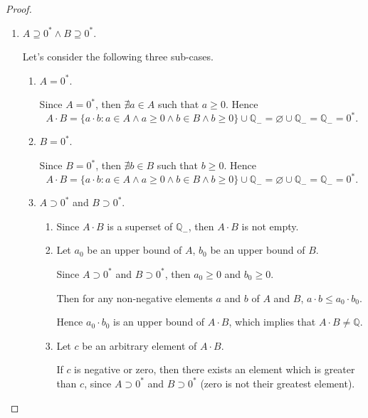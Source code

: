 \begin{proof}
    \begin{enumerate}[label={\textbf{Case \arabic*.}},itemindent={0.5cm}]
        \item $A\supseteq {0}^{*}\land B\supseteq {0}^{*}$.

              Let's consider the following three sub-cases.
              \begin{enumerate}
                  \item $A = {0}^{*}$.

                        Since $A = {0}^{*}$, then $\nexists a\in A$ such that $a\ge 0$. Hence
                        \[
                            A\cdot B = \{ a\cdot b: a\in A\land a\ge 0\land b\in B\land b\ge 0 \} \cup\mathbb{Q}_{-} = \varnothing\cup\mathbb{Q}_{-} = \mathbb{Q}_{-} = {0}^{*}.
                        \]
                  \item $B = {0}^{*}$.

                        Since $B = {0}^{*}$, then $\nexists b\in B$ such that $b\ge 0$. Hence
                        \[
                            A\cdot B = \{ a\cdot b: a\in A\land a\ge 0\land b\in B\land b\ge 0 \} \cup\mathbb{Q}_{-} = \varnothing\cup\mathbb{Q}_{-} = \mathbb{Q}_{-} = {0}^{*}.
                        \]
                  \item $A\supset{0}^{*}$ and $B\supset{0}^{*}$.
                        \begin{enumerate}[label = (\roman*)]
                            \item Since $A\cdot B$ is a superset of $\mathbb{Q}_{-}$, then $A\cdot B$ is not empty.
                            \item Let $a_{0}$ be an upper bound of $A$, $b_{0}$ be an upper bound of $B$.

                                  Since $A\supset{0}^{*}$ and $B\supset{0}^{*}$, then $a_{0}\ge 0$ and $b_{0}\ge 0$.

                                  Then for any non-negative elements $a$ and $b$ of $A$ and $B$, $a\cdot b \le a_{0}\cdot b_{0}$.

                                  Hence $a_{0}\cdot b_{0}$ is an upper bound of $A\cdot B$, which implies that $A\cdot B\ne\mathbb{Q}$.
                            \item Let $c$ be an arbitrary element of $A\cdot B$.

                                  If $c$ is negative or zero, then there exists an element which is greater than $c$, since $A\supset {0}^{*}$ and $B\supset {0}^{*}$ (zero is not their greatest element).


\end{enumerate}
\end{enumerate}
\end{enumerate}
\end{proof}
